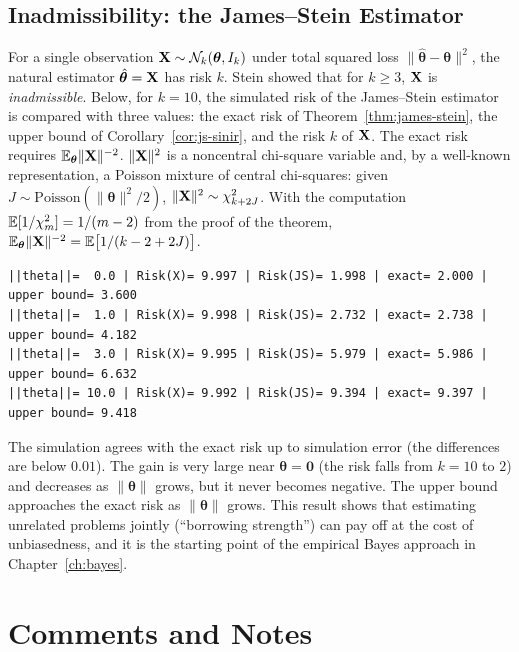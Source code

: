 \documentclass[main.tex]{subfiles}
\begin{document}
\subsection{Inadmissibility: the James--Stein Estimator}
For a single observation $\mathbf{X}\sim\mathcal{N}_k(\bm\theta,I_k)$ under total squared loss $\|\hat{\bm\theta}-\bm\theta\|^2$, the natural estimator $\hat{\bm\theta}=\mathbf{X}$ has risk $k$. Stein \cite{stein56} showed that for $k\ge3$, $\mathbf{X}$ is \emph{inadmissible}. Below, for $k=10$, the simulated risk of the James--Stein estimator \cite{james-stein61} is compared with three values: the exact risk of Theorem~\ref{thm:james-stein}, the upper bound of Corollary~\ref{cor:js-sinir}, and the risk $k$ of $\mathbf{X}$. The exact risk requires $\mathbb{E}_{\bm\theta}\|\mathbf{X}\|^{-2}$. $\|\mathbf{X}\|^2$ is a noncentral chi-square variable and, by a well-known representation, a Poisson mixture of central chi-squares: given $J\sim\text{Poisson}(\|\bm\theta\|^2/2)$, $\|\mathbf{X}\|^2\sim\chi^2_{k+2J}$. With the computation $\mathbb{E}[1/\chi^2_m]=1/(m-2)$ from the proof of the theorem, $\mathbb{E}_{\bm\theta}\|\mathbf{X}\|^{-2}=\mathbb{E}\big[1/(k-2+2J)\big]$.

\begin{lstlisting}[style=output]
||theta||=  0.0 | Risk(X)= 9.997 | Risk(JS)= 1.998 | exact= 2.000 | upper bound= 3.600
||theta||=  1.0 | Risk(X)= 9.998 | Risk(JS)= 2.732 | exact= 2.738 | upper bound= 4.182
||theta||=  3.0 | Risk(X)= 9.995 | Risk(JS)= 5.979 | exact= 5.986 | upper bound= 6.632
||theta||= 10.0 | Risk(X)= 9.992 | Risk(JS)= 9.394 | exact= 9.397 | upper bound= 9.418
\end{lstlisting}

The simulation agrees with the exact risk up to simulation error (the differences are below $0.01$). The gain is very large near $\bm\theta=\mathbf 0$ (the risk falls from $k=10$ to $2$) and decreases as $\|\bm\theta\|$ grows, but it never becomes negative. The upper bound approaches the exact risk as $\|\bm\theta\|$ grows. This result shows that estimating unrelated problems jointly (``borrowing strength'') can pay off at the cost of unbiasedness, and it is the starting point of the empirical Bayes approach in Chapter~\ref{ch:bayes}.

\section{Comments and Notes}
\end{document}

